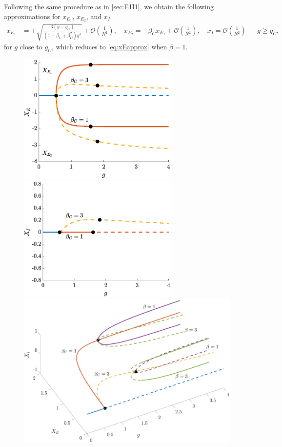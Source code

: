 \documentclass[reqno]{siamonline190516}
\begin{document}
Following the same procedure as in \cref{sec:E1I1}, we obtain the following approximations for $x_{E_1}$, $x_{E_2}$, and $x_I$
\begin{align}\label{eq:XE1}
x_{E_1} &= \pm \sqrt{ \frac{ 3(g - g_C) }{ (1 - \beta_C + \beta_C^2 )g^3}} + \mathcal{O}\left( \frac{1}{N^2}\right), \quad
x_{E_2} = -\beta_C x_{E_1} + \mathcal{O}\left( \frac{1}{N^2} \right), \quad
x_I = \mathcal{O}\left( \frac{1}{N^2} \right)
&& g \geq g_C,
\end{align}
for $g$ close to $g_C$, which reduces to \cref{eq:xEapprox} when $\beta = 1$.

\begin{figure}
    \centering
    \includegraphics[width=8cm]{images/bdclusters20c4E.eps} 
    \includegraphics[width=8cm]{images/bdclusters20c4I.eps} 
    \vspace{-0.5cm}
    \includegraphics[width=16cm]{images/bdclusters20c43D.eps} 

\end{figure}
\end{document}
